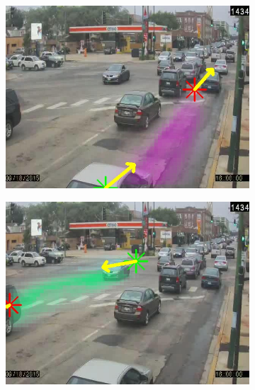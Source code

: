 \begin{figure}
        \begin{subfigure}{0.32\linewidth}
            \includegraphics[width=\linewidth]{./img/scene_learning/res/diverseyWestern/diverseyWestern-3.jpg}
        \end{subfigure}
        \begin{subfigure}{0.32\linewidth}
            \includegraphics[width=\linewidth]{./img/scene_learning/res/diverseyWestern/diverseyWestern-4.jpg}
        \end{subfigure}
        \begin{subfigure}{0.32\linewidth}

\end{subfigure}
\end{figure}
